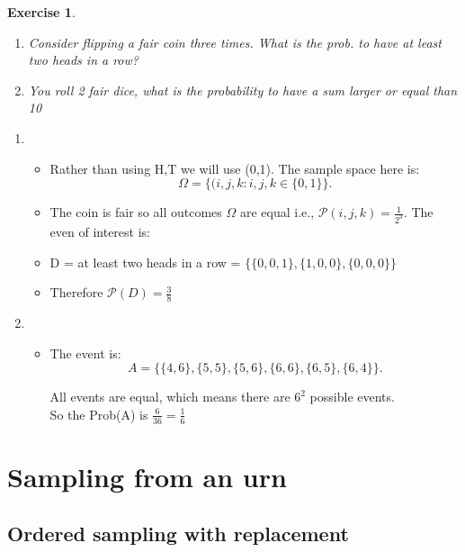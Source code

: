 \documentclass[a4paper]{article}
\newcounter{counter}
\numberwithin{counter}{subsection}
\theoremstyle{break}
\newtheorem{exe}[counter]{Exercise}
\begin{document}
\begin{exe}
    \begin{enumerate}
		\item Consider flipping a fair coin three times. What is the prob. to have at least two heads in a row?
		\item You roll 2 fair dice, what is the probability to have a sum larger or equal than 10
    \end{enumerate}
\end{exe}
\begin{sol}

    \begin{enumerate}
        \item \begin{itemize}
            \item Rather than using {H,T} we will use (0,1). The sample space here is: \[
                    \Omega = \{(i,j, k: i,j,k \in \{0,1\} \} 
            .\] 
        \item The coin is fair so all outcomes $\Omega$	are equal i.e., $\mathcal{P}({i,j,k}) = \frac{1}{2^3}$. The even of interest is:
        \item D = {at least two heads in a row} = $\{\{0,0,1\},\{1,0,0\}, \{0,0,0\} \}$
        \item Therefore $\mathcal{P}(D) = \frac{3}{8}$
        \end{itemize}
            
    \item \begin{itemize}
        \item The event is: \[
        A = \{\{4,6\}, \{5,5\}, \{5,6\}, \{6,6\}, \{6,5\}, \{6,4\} \} 
        .\] 

        All events are equal, which means there are $6^2$ possible events. \\
        So the Prob(A) is $\frac{6}{36} = \frac{1}{6}$
        \end{itemize}
    \end{enumerate}
\end{sol}

	\section{Sampling from an urn}%
	
	\subsection{Ordered sampling with replacement}%
	
\end{document}
